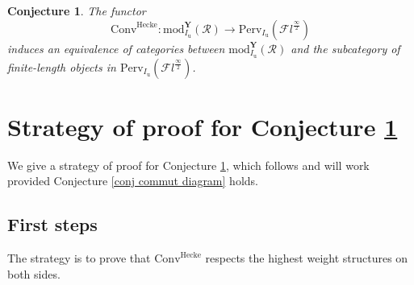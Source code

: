 \documentclass[11pt]{amsart}
\theoremstyle{plain}
\newtheorem{conj}{Conjecture}[section]
\theoremstyle{remark}
\numberwithin{equation}{section}
\begin{document}
\begin{conj}\label{main conjecture}
		The functor 
		$$\mathrm{Conv}^{\mathrm{Hecke}}:\mathrm{mod}^\mathbf{Y}_{I_\mathrm{u}}(\mathcal{R})\to\mathrm{Perv}_{{I_\mathrm{u}}}(\mathcal{F}l^{\frac{\infty}{2}}) $$
		induces an equivalence of categories between $\mathrm{mod}^\mathbf{Y}_{I_\mathrm{u}}(\mathcal{R})$ and the subcategory of finite-length objects in $\mathrm{Perv}_{{I_\mathrm{u}}}(\mathcal{F}l^{\frac{\infty}{2}})$.
	\end{conj}
\section{Strategy of proof for Conjecture \ref{main conjecture}}\label{section Strategy of proof for the conjecture}
We give a strategy of proof for Conjecture \ref{main conjecture}, which follows \cite{ABBGM} and will work provided Conjecture \ref{conj commut diagram} holds.
\subsection{First steps}
The strategy is to prove that $\mathrm{Conv}^{\mathrm{Hecke}}$ respects the highest weight structures on both sides. 
\end{document}
